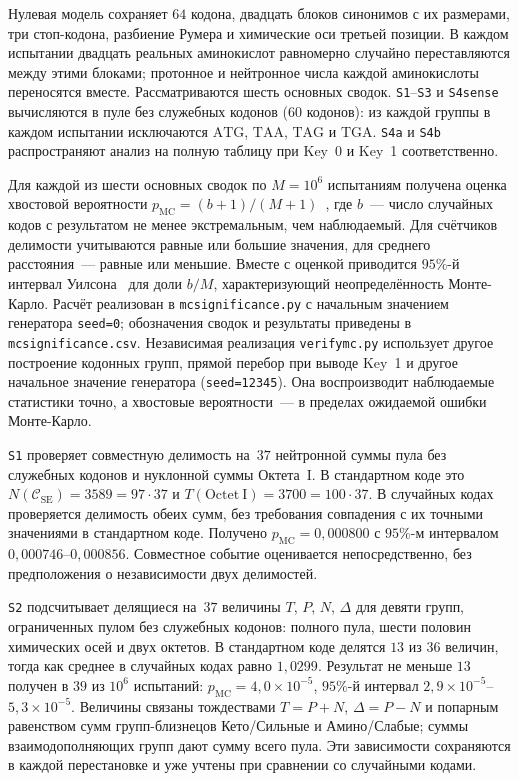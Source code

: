 \documentclass[11pt,a4paper]{article}
\renewcommand{\_}{\origunderscore\allowbreak}
\begin{document}
Нулевая модель сохраняет $64$ кодона, двадцать блоков синонимов
с их размерами, три стоп-кодона, разбиение Румера и химические
оси третьей позиции. В каждом испытании двадцать реальных
аминокислот равномерно случайно переставляются между этими
блоками; протонное и нейтронное числа каждой аминокислоты
переносятся вместе. Рассматриваются шесть основных сводок.
\texttt{S1}--\texttt{S3} и \texttt{S4sense} вычисляются в пуле
без служебных кодонов ($60$ кодонов): из каждой группы в каждом испытании
исключаются $\mathrm{ATG}$, $\mathrm{TAA}$, $\mathrm{TAG}$ и
$\mathrm{TGA}$. \texttt{S4a} и \texttt{S4b} распространяют
анализ на полную таблицу при Key~0 и Key~1 соответственно.

Для каждой из шести основных сводок по $M=10^{6}$ испытаниям получена оценка
хвостовой вероятности $p_{\mathrm{MC}}=(b+1)/(M+1)$~\cite{north2002}, где $b$~---
число случайных кодов с результатом не менее экстремальным, чем
наблюдаемый. Для счётчиков делимости учитываются равные или
большие значения, для среднего расстояния~--- равные или меньшие.
Вместе с оценкой приводится $95\%$-й интервал Уилсона~\cite{wilson1927} для доли
$b/M$, характеризующий неопределённость Монте-Карло.
Расчёт реализован в \texttt{mc\_significance.py} с начальным
значением генератора \texttt{seed=0}; обозначения
сводок и результаты приведены в \texttt{mc\_significance.csv}.
Независимая реализация \texttt{verify\_mc.py} использует другое
построение кодонных групп, прямой перебор при выводе Key~1 и
другое начальное значение генератора (\texttt{seed=12345}).
Она воспроизводит наблюдаемые
статистики точно, а хвостовые вероятности~--- в пределах ожидаемой
ошибки Монте-Карло.

\texttt{S1} проверяет совместную делимость на~$37$ нейтронной
суммы пула без служебных кодонов и нуклонной суммы Октета~I.
В стандартном коде это
$N(\mathcal{C}_{\mathrm{SE}}) = 3589 = 97 \cdot 37$ и
$T(\mathrm{Octet~I}) = 3700 = 100 \cdot 37$.
В случайных кодах проверяется делимость обеих сумм, без требования
совпадения с их точными значениями в стандартном коде.
Получено $p_{\mathrm{MC}} = 0{,}000800$ с $95\%$-м интервалом
$0{,}000746$--$0{,}000856$. Совместное событие оценивается
непосредственно, без предположения о независимости двух делимостей.

\texttt{S2} подсчитывает делящиеся на~$37$ величины $T$, $P$,
$N$, $\Delta$ для девяти групп, ограниченных пулом без служебных
кодонов: полного пула, шести половин химических осей и двух
октетов. В стандартном коде делятся $13$ из $36$ величин,
тогда как среднее в случайных кодах равно $1{,}0299$.
Результат не меньше $13$ получен в $39$ из $10^{6}$ испытаний:
$p_{\mathrm{MC}} = 4{,}0 \times 10^{-5}$,
$95\%$-й интервал $2{,}9 \times 10^{-5}$--$5{,}3 \times 10^{-5}$.
Величины связаны тождествами $T=P+N$, $\Delta=P-N$ и
попарным равенством сумм групп-близнецов Кето/Сильные и
Амино/Слабые; суммы взаимодополняющих групп дают сумму всего пула.
Эти зависимости сохраняются в каждой перестановке
и уже учтены при сравнении со случайными кодами.
\end{document}

